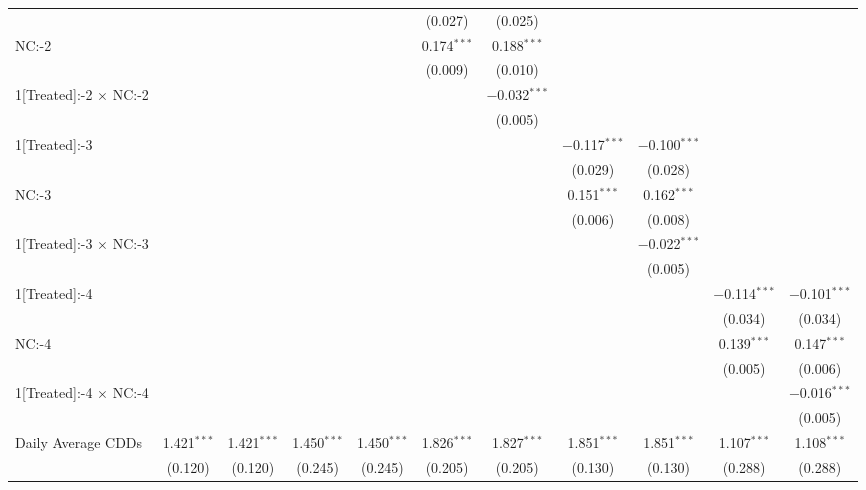 \begin{table}[!htbp]
\begin{adjustbox}{scale = 0.75}
\begin{tabular}{@{\extracolsep{5pt}}lcccccccccc}
  &  &  &  &  & (0.027) & (0.025) &  &  &  &  \\ 
 NC:-2 &  &  &  &  & 0.174$^{***}$ & 0.188$^{***}$ &  &  &  &  \\ 
  &  &  &  &  & (0.009) & (0.010) &  &  &  &  \\ 
 1[Treated]:-2 $\times$ NC:-2 &  &  &  &  &  & $-$0.032$^{***}$ &  &  &  &  \\ 
  &  &  &  &  &  & (0.005) &  &  &  &  \\ 
 1[Treated]:-3 &  &  &  &  &  &  & $-$0.117$^{***}$ & $-$0.100$^{***}$ &  &  \\ 
  &  &  &  &  &  &  & (0.029) & (0.028) &  &  \\ 
 NC:-3 &  &  &  &  &  &  & 0.151$^{***}$ & 0.162$^{***}$ &  &  \\ 
  &  &  &  &  &  &  & (0.006) & (0.008) &  &  \\ 
 1[Treated]:-3 $\times$ NC:-3 &  &  &  &  &  &  &  & $-$0.022$^{***}$ &  &  \\ 
  &  &  &  &  &  &  &  & (0.005) &  &  \\ 
 1[Treated]:-4 &  &  &  &  &  &  &  &  & $-$0.114$^{***}$ & $-$0.101$^{***}$ \\ 
  &  &  &  &  &  &  &  &  & (0.034) & (0.034) \\ 
 NC:-4 &  &  &  &  &  &  &  &  & 0.139$^{***}$ & 0.147$^{***}$ \\ 
  &  &  &  &  &  &  &  &  & (0.005) & (0.006) \\ 
 1[Treated]:-4 $\times$ NC:-4 &  &  &  &  &  &  &  &  &  & $-$0.016$^{***}$ \\ 
  &  &  &  &  &  &  &  &  &  & (0.005) \\ 
 Daily Average CDDs & 1.421$^{***}$ & 1.421$^{***}$ & 1.450$^{***}$ & 1.450$^{***}$ & 1.826$^{***}$ & 1.827$^{***}$ & 1.851$^{***}$ & 1.851$^{***}$ & 1.107$^{***}$ & 1.108$^{***}$ \\ 
  & (0.120) & (0.120) & (0.245) & (0.245) & (0.205) & (0.205) & (0.130) & (0.130) & (0.288) & (0.288) \\ 

\end{tabular}
\end{adjustbox}
\end{table}
